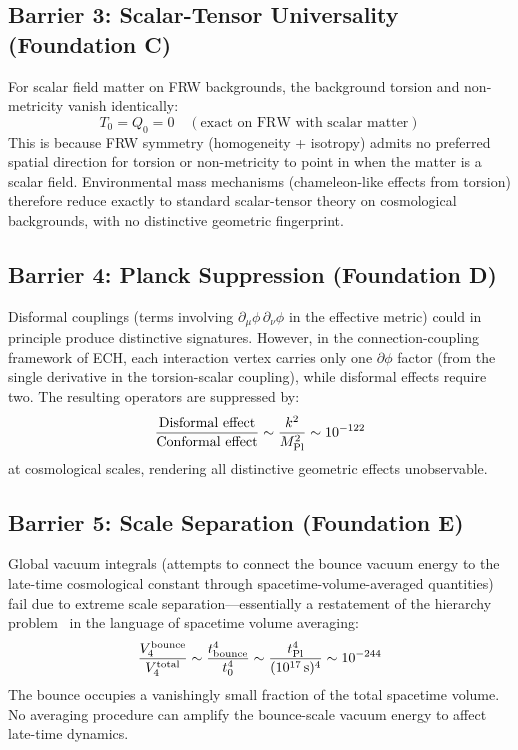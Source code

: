 \documentclass[aps,prd,twocolumn,superscriptaddress,showpacs,preprintnumbers,nofootinbib,longbibliography,floatfix]{revtex4-2}
\newcommand{\MPl}{M_{\rm Pl}}
\begin{document}
\subsection{Barrier 3: Scalar-Tensor Universality (Foundation C)}

For scalar field matter on FRW backgrounds, the background torsion and non-metricity vanish identically:
\begin{equation}
T_0 = Q_0 = 0 \quad (\text{exact on FRW with scalar matter})
\end{equation}
This is because FRW symmetry (homogeneity + isotropy) admits no preferred spatial direction for torsion or non-metricity to point in when the matter is a scalar field. Environmental mass mechanisms (chameleon-like effects from torsion) therefore reduce exactly to standard scalar-tensor theory on cosmological backgrounds, with no distinctive geometric fingerprint.

\subsection{Barrier 4: Planck Suppression (Foundation D)}

Disformal couplings (terms involving $\partial_\mu\phi\,\partial_\nu\phi$ in the effective metric) could in principle produce distinctive signatures. However, in the connection-coupling framework of ECH, each interaction vertex carries only one $\partial\phi$ factor (from the single derivative in the torsion-scalar coupling), while disformal effects require two. The resulting operators are suppressed by:
\begin{equation}
\frac{\text{Disformal effect}}{\text{Conformal effect}} \sim \frac{k^2}{\MPl^2} \sim 10^{-122}
\end{equation}
at cosmological scales, rendering all distinctive geometric effects unobservable.

\subsection{Barrier 5: Scale Separation (Foundation E)}

Global vacuum integrals (attempts to connect the bounce vacuum energy to the late-time cosmological constant through spacetime-volume-averaged quantities) fail due to extreme scale separation---essentially a restatement of the hierarchy problem~\cite{Weinberg1989} in the language of spacetime volume averaging:
\begin{equation}
\frac{V_4^{\rm bounce}}{V_4^{\rm total}} \sim \frac{t_{\rm bounce}^4}{t_0^4} \sim \frac{t_{\rm Pl}^4}{(10^{17}\,\text{s})^4} \sim 10^{-244}
\end{equation}
The bounce occupies a vanishingly small fraction of the total spacetime volume. No averaging procedure can amplify the bounce-scale vacuum energy to affect late-time dynamics.
\end{document}
